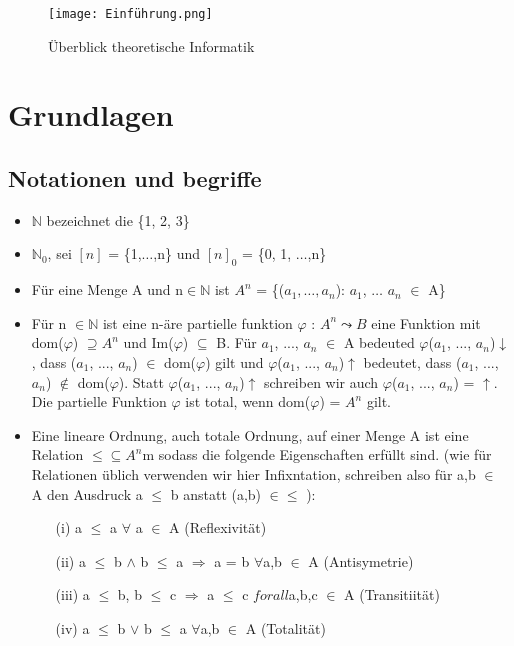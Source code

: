 \documentclass[a4paper,11pt]{article}
\begin{document}
\begin{figure}
    \centering
    \texttt{[image: Einführung.png]}
    \caption{Überblick theoretische Informatik}
    \label{fig:example}
\end{figure}

\section{Grundlagen}

\subsection{Notationen und begriffe}
\begin{itemize}
    \item $\mathbb{N}$ bezeichnet die \{1, 2, 3\}
    \item $\mathbb{N}_{0}$, sei $[n]$ = \{1,$\ldots $,n\} und $[n]_{0}$ = \{0, 1, $\ldots $,n\} 
    \item Für eine Menge A und n$\in \mathbb{N}$ ist $A^{n}$ = \{($a_{1},\ldots, a_{n}$): $a_{1}$, $\ldots$ $a_{n}$ $\in$ A\}
    \item Für n $\in \mathbb{N}$ ist eine n-äre partielle funktion $\varphi$ : $A^{n} \leadsto B $ eine Funktion mit dom($\varphi$) $\supseteq A^{n}$ und Im($\varphi$) $\subseteq$ B. 
    Für $a_{1}$, ..., $a_{n}$ $\in$ A bedeuted $\varphi$($a_{1}$, ..., $a_{n}$)$\downarrow$, dass ($a_{1}$, ..., $a_{n}$) $\in$ dom($\varphi$) gilt und $\varphi$($a_{1}$, ..., $a_{n}$)$\uparrow$ bedeutet, 
    dass ($a_{1}$, ..., $a_{n}$) $\notin$ dom($\varphi$). Statt $\varphi$($a_{1}$, ..., $a_{n}$)$\uparrow$ schreiben wir auch $\varphi$($a_{1}$, ..., $a_{n}$) = $\uparrow$.
    Die partielle Funktion $\varphi$ ist total, wenn dom($\varphi$) = $A^{n}$ gilt.
    \item Eine lineare Ordnung, auch totale Ordnung, auf einer Menge A ist eine Relation $\leq  \subseteq  A^{n}$m sodass die folgende Eigenschaften erfüllt sind. 
    (wie für Relationen üblich verwenden wir hier Infixntation, schreiben also für a,b $\in$ A den Ausdruck a $\leq $ b anstatt (a,b) $\in \leq $ ): 
    \begin{enumerate}
        \item[(i)] a $\leq $ a $\forall$ a $\in$ A (Reflexivität)
        \item[(ii)] a $\leq $ b $ \land $ b $\leq $ a $\Rightarrow $ a = b $\forall$a,b $\in$ A (Antisymetrie)
        \item[(iii)] a $\leq $ b, b $\leq $ c $\Rightarrow$ a $\leq $ c $forall$a,b,c $\in$ A (Transitiität)
        \item[(iv)] a $\leq $ b $\vee$ b $\leq $ a $\forall$a,b $\in$ A (Totalität)
    \end{enumerate} 
\end{itemize}
\end{document}
